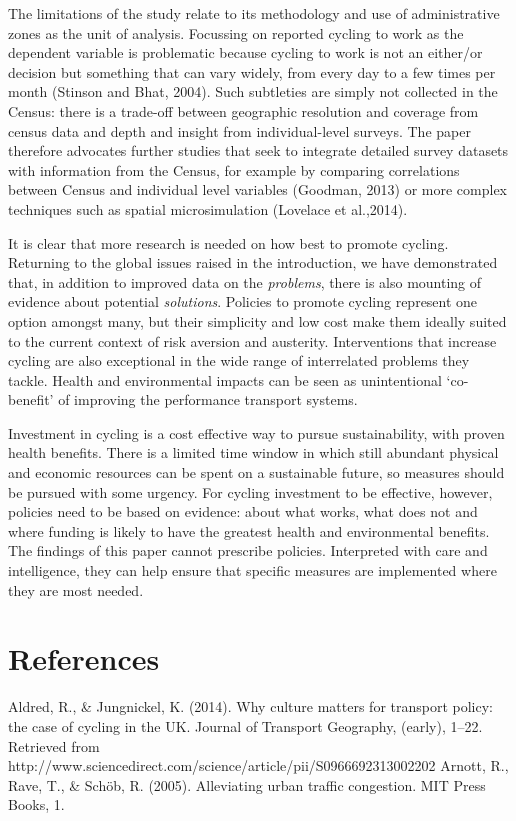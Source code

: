 The limitations of the study relate to its methodology and use of
administrative zones as the unit of analysis. Focussing on reported
cycling to work as the dependent variable is problematic because cycling
to work is not an either/or decision but something that can vary widely,
from every day to a few times per month (Stinson and Bhat, 2004). Such
subtleties are simply not collected in the Census: there is a trade-off
between geographic resolution and coverage from census data and depth
and insight from individual-level surveys. The paper therefore advocates
further studies that seek to integrate detailed survey datasets with
information from the Census, for example by comparing correlations
between Census and individual level variables (Goodman, 2013) or more
complex techniques such as spatial microsimulation (Lovelace et
al.,2014).

It is clear that more research is needed on how best to promote cycling.
Returning to the global issues raised in the introduction, we have
demonstrated that, in addition to improved data on the \emph{problems},
there is also mounting of evidence about potential \emph{solutions}.
Policies to promote cycling represent one option amongst many, but their
simplicity and low cost make them ideally suited to the current context
of risk aversion and austerity. Interventions that increase cycling are
also exceptional in the wide range of interrelated problems they tackle.
Health and environmental impacts can be seen as unintentional
`co-benefit' of improving the performance transport systems.

Investment in cycling is a cost effective way to pursue sustainability,
with proven health benefits. There is a limited time window in which
still abundant physical and economic resources can be spent on a
sustainable future, so measures should be pursued with some urgency. For
cycling investment to be effective, however, policies need to be based
on evidence: about what works, what does not and where funding is likely
to have the greatest health and environmental benefits. The findings of
this paper cannot prescribe policies. Interpreted with care and
intelligence, they can help ensure that specific measures are
implemented where they are most needed.

\section{References}\label{references}

Aldred, R., \& Jungnickel, K. (2014). Why culture matters for transport
policy: the case of cycling in the UK. Journal of Transport Geography,
(early), 1--22. Retrieved from
http://www.sciencedirect.com/science/article/pii/S0966692313002202
Arnott, R., Rave, T., \& Schöb, R. (2005). Alleviating urban traffic
congestion. MIT Press Books, 1.

